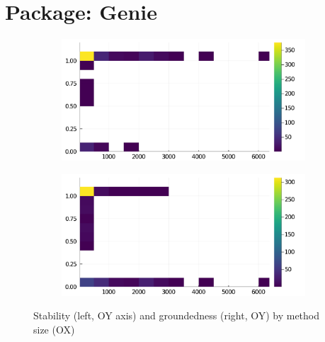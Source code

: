 \section*{Package: Genie}
\begin{figure}[h]
     \begin{subfigure}[b]{0.49\textwidth}
       \includegraphics[width=\textwidth]{figs/all-package-graphs/Genie-size-vs-stable.pdf}
     \end{subfigure}
     \begin{subfigure}[b]{0.49\textwidth}
       \includegraphics[width=\textwidth]{figs/all-package-graphs/Genie-size-vs-grounded.pdf}
     \end{subfigure}
\caption{Stability (left, OY axis) and groundedness (right, OY) by method size (OX)}%
%
\label{figs:size:Genie}
\end{figure}

